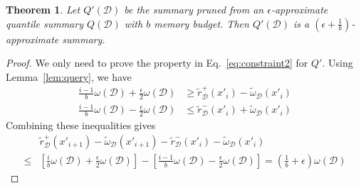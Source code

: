 \documentclass{sig-alternate-05-2015}
\newcommand{\eps}{\epsilon}
\newcommand{\w}{\omega}
\newcommand{\sD}{\mathcal{D}}
\newcommand{\tdr}{\tilde{r}_{\sD}}
\newcommand{\tdw}{\tilde{\omega}_{\sD}}
\newtheorem{thm:thm}{Theorem}[section]
\begin{document}
\begin{thm:thm}
Let $Q'(\sD)$  be the summary pruned from  an $\eps$-approximate quantile summary $Q(\sD)$ with $b$ memory budget.
 Then $Q'(\sD)$ is a $(\eps+\frac{1}{b})$-approximate summary.
\end{thm:thm}
\begin{proof}
We only need to prove the property in Eq.~\eqref{eq:constraint2} for $Q'$.
Using Lemma~\ref{lem:query}, we have
\begin{equation*}
\begin{split}
    \frac{i-1}{b}\w(\sD)   + \frac{\eps}{2} \w(\sD)  &\geq \tdr^+(x'_i) - \tdw(x'_i)\\
    \frac{i-1}{b}\w(\sD)   - \frac{\eps}{2} \w(\sD) &\leq \tdr^-(x'_i) +\tdw(x'_i)
\end{split}
\end{equation*}
Combining these inequalities gives
\begin{equation*}
\begin{split}
 &\tdr^+(x'_{i+1}) - \tdw(x'_{i+1})  -  \tdr^-(x'_{i}) - \tdw(x'_{i}) \\
 \leq& [ \frac{i}{b}\w(\sD) + \frac{\eps}{2} \w(\sD)] - [ \frac{i-1}{b}\w(\sD) - \frac{\eps}{2} \w(\sD)] = (\frac{1}{b} + \eps)\w(\sD)
\end{split}
\end{equation*}
\end{proof}


\end{document}
